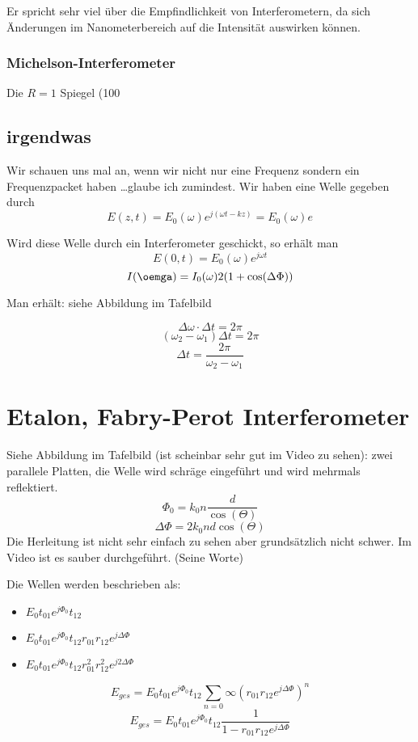 \documentclass[a4paper]{article}
\begin{document}
Er spricht sehr viel über die Empfindlichkeit von Interferometern, da sich Änderungen im Nanometerbereich auf die Intensität auswirken können.

\subsubsection*{Michelson-Interferometer}
Die $R=1$ Spiegel (100%


\subsection*{irgendwas}
Wir schauen uns mal an, wenn wir nicht nur eine Frequenz sondern ein Frequenzpacket haben \ldots glaube ich zumindest.
Wir haben eine Welle gegeben durch
\[ E(z,t)=E_{0}(\omega)e^{j(\omega t-kz)}=E_{0}(\omega)e^{}\]

Wird diese Welle durch ein Interferometer geschickt, so erhält man
\[ E(0,t)=E_{0}(\omega)e^{j\omega t} \]
\[ I(\oemga)=I_{0}(\omega)2(1+\cos(\Delta \Phi)) \]

Man erhält: siehe Abbildung im Tafelbild

\[ \Delta\omega\cdot \Delta t = 2\pi \]
\[ (\omega_{2}-\omega_{1})\Delta t = 2\pi \]
\[ \Delta t = \frac{2\pi}{\omega_{2}-\omega_{1}} \]

\section*{Etalon, Fabry-Perot Interferometer}
Siehe Abbildung im Tafelbild (ist scheinbar sehr gut im Video zu sehen): zwei parallele Platten, die Welle wird schräge eingeführt und wird mehrmals reflektiert.
\[ \Phi_{0}=k_{0}n \frac{d}{\cos(\Theta)} \]
\[ \Delta\Phi=2k_{0}nd\cos(\Theta) \]
Die Herleitung ist nicht sehr einfach zu sehen aber grundsätzlich nicht schwer. Im Video ist es sauber durchgeführt. (Seine Worte)

Die Wellen werden beschrieben als:
\begin{itemize}
    \item $E_{0}t_{01}e^{j\Phi_{0}}t_{12}$
    \item $E_{0}t_{01}e^{j\Phi_{0}}t_{12}r_{01}r_{12}e^{j\Delta\Phi}$
    \item $E_{0}t_{01}e^{j\Phi_{0}}t_{12}r_{01}^{2}r_{12}^{2}e^{j2\Delta\Phi}$
\end{itemize}
\[ E_{ges}=E_{0}t_{01}e^{j\Phi_{0}}t_{12} \sum_{n=0}{\infty} (r_{01}r_{12}e^{j\Delta\Phi})^{n} \]
\[ E_{ges}=E_{0}t_{01}e^{j\Phi_{0}}t_{12} \frac{1}{1-r_{01}r_{12}e^{j\Delta\Phi}} \]
\end{document}
